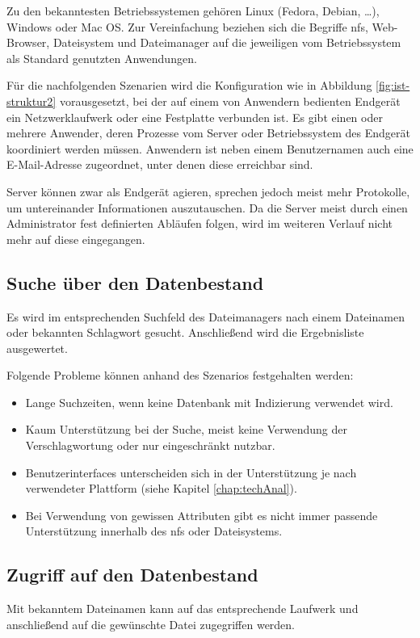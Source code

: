 \documentclass[oneside, ngerman, toc=bibliography,bibliography=totoc,listof=entryprefix, open=right,numbers=noenddot,fontsize=12pt]{scrbook}
\begin{document}
Zu den bekanntesten Betriebssystemen gehören Linux (Fedora, Debian, \ldots), Windows oder Mac OS. Zur Vereinfachung beziehen sich die Begriffe  \acrshort{nfs}, Web-Browser, Dateisystem und Dateimanager auf die jeweiligen vom Betriebssystem als Standard genutzten Anwendungen.

Für die nachfolgenden Szenarien wird die Konfiguration wie in Abbildung \ref{fig:ist-struktur2} vorausgesetzt, bei der auf einem von Anwendern bedienten Endgerät ein Netzwerklaufwerk oder eine Festplatte verbunden ist. Es gibt einen oder mehrere Anwender, deren Prozesse vom Server oder Betriebssystem des Endgerät koordiniert werden müssen. Anwendern ist neben einem Benutzernamen auch eine E-Mail-Adresse zugeordnet, unter denen diese erreichbar sind.

Server können zwar als Endgerät agieren, sprechen jedoch meist mehr Protokolle, um untereinander Informationen auszutauschen. Da die Server meist durch einen Administrator fest definierten Abläufen folgen, wird im weiteren Verlauf nicht mehr auf diese eingegangen.


\subsection*{Suche über den Datenbestand}
Es wird im entsprechenden Suchfeld des Dateimanagers nach einem Dateinamen oder bekannten Schlagwort gesucht. Anschließend wird die Ergebnisliste ausgewertet.

\bigskip
Folgende Probleme können anhand des Szenarios festgehalten werden:
\begin{itemize}
	\item Lange Suchzeiten, wenn keine Datenbank mit Indizierung verwendet wird.
	\item Kaum Unterstützung bei der Suche, meist keine Verwendung der Verschlagwortung oder nur eingeschränkt nutzbar. 
	\item Benutzerinterfaces unterscheiden sich in der Unterstützung je nach verwendeter Plattform (siehe Kapitel \ref{chap:techAnal}).
	\item Bei Verwendung von gewissen Attributen gibt es nicht immer passende Unterstützung innerhalb des \acrshort{nfs} oder Dateisystems.
\end{itemize}

\subsection*{Zugriff auf den Datenbestand}
Mit bekanntem Dateinamen kann auf das entsprechende Laufwerk und anschließend auf die gewünschte Datei zugegriffen werden.
\end{document}

